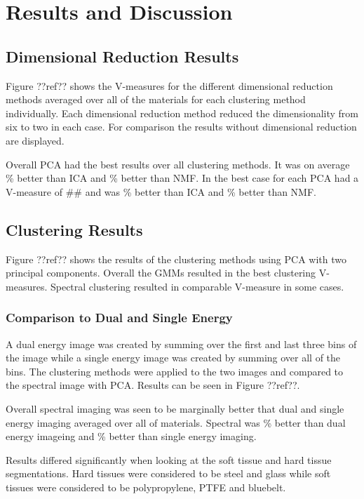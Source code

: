 \documentclass[a4paper,11pt]{article}
\begin{document}
\section{Results and Discussion}

\subsection{Dimensional Reduction Results}

Figure ??ref?? shows the V-measures for the different dimensional reduction methods averaged over all of the materials for each clustering method individually. Each dimensional reduction method reduced the dimensionality from six to two in each case. For comparison the results without dimensional reduction are displayed.

Overall PCA had the best results over all clustering methods. It was on average \% better than ICA and \% better than NMF. In the best case for each PCA had a V-measure of ## and was \% better than ICA and \% better than NMF.

\subsection{Clustering Results}

Figure ??ref?? shows the results of the clustering methods using PCA with two principal components. Overall the GMMs resulted in the best clustering V-measures. Spectral clustering resulted in comparable V-measure in some cases.

\subsubsection{Comparison to Dual and Single Energy}

A dual energy image was created by summing over the first and last three bins of the image while a single energy image was created by summing over all of the bins. The clustering methods were applied to the two images and compared to the spectral image with PCA. Results can be seen in Figure ??ref??.

Overall spectral imaging was seen to be marginally better that dual and single energy imaging averaged over all of materials. Spectral was \% better than dual energy imageing and \% better than single energy imaging.

Results differed significantly when looking at the soft tissue and hard tissue segmentations. Hard tissues were considered to be steel and glass while soft tissues were considered to be polypropylene, PTFE and bluebelt.
\end{document}
